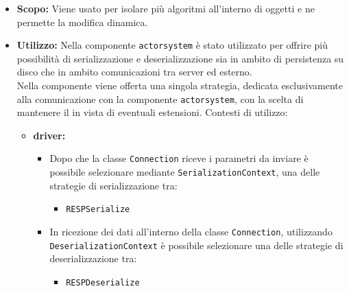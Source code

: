\documentclass{scalatekids-article}
\begin{document}
\begin{itemize}
\item \textbf{Scopo:} Viene usato per isolare più algoritmi all'interno di oggetti e
  ne permette la modifica dinamica.
\item \textbf{Utilizzo:} Nella componente \verb=actorsystem= è stato utilizzato
  per offrire più possibilità di serializzazione e deserializzazione sia in
  ambito di persistenza su disco che in ambito comunicazioni tra server ed
  esterno.\\ Nella componente  viene offerta una singola
  strategia, dedicata esclusivamente alla comunicazione con la componente
  \verb=actorsystem=, con la scelta di mantenere il  in
  vista di eventuali estensioni. Contesti di utilizzo:
  \begin{itemize}

  \item \textbf{driver:}
    \begin{itemize}
    \item Dopo che la classe \verb=Connection= riceve i parametri da inviare è
      possibile selezionare mediante \verb=SerializationContext=, una delle
      strategie di serializzazione tra:
      \begin{itemize}
      \item \verb=RESPSerialize=
      \end{itemize}
    \end{itemize}
    \begin{itemize}
    \item In ricezione dei dati all'interno della classe \verb=Connection=, utilizzando
      \verb=DeserializationContext= è possibile selezionare una delle
      strategie di deserializzazione tra:
      \begin{itemize}
      \item \verb=RESPDeserialize=
      \end{itemize}
    \end{itemize}


\end{itemize}
\end{itemize}
\end{document}
